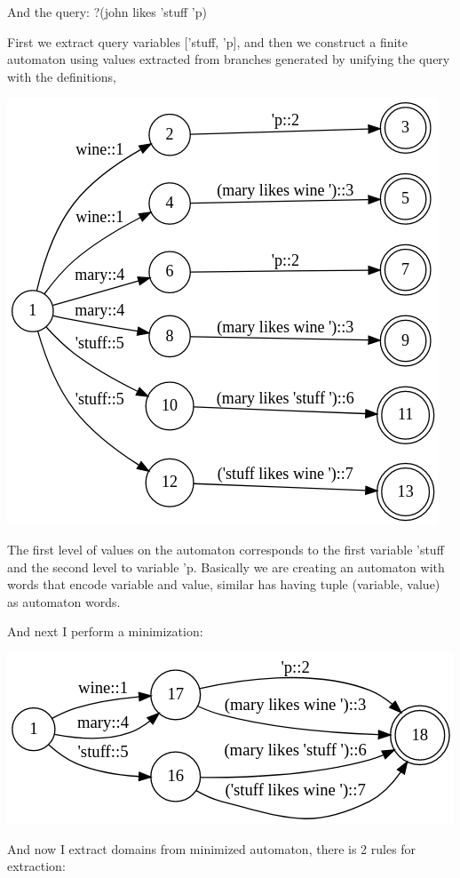 \documentclass{article}
\begin{document}
And the query: ?(john likes 'stuff 'p)

First we extract query variables ['stuff, 'p], and then we construct a finite automaton using 
values extracted from branches generated by unifying the query with the definitions,

\includegraphics{sources/posts/variables domain (part 1)/john_likes_nfa.png}

The first level of values on the automaton corresponds to the first variable 'stuff and the 
second level to variable 'p. Basically we are creating an automaton with words that encode variable and value, 
similar has having tuple (variable, value) as automaton words.

And next I perform a minimization:

\includegraphics{sources/posts/variables domain (part 1)/john_likes_min.png}

And now I extract domains from minimized automaton, there is 2 rules for extraction:
\end{document}

